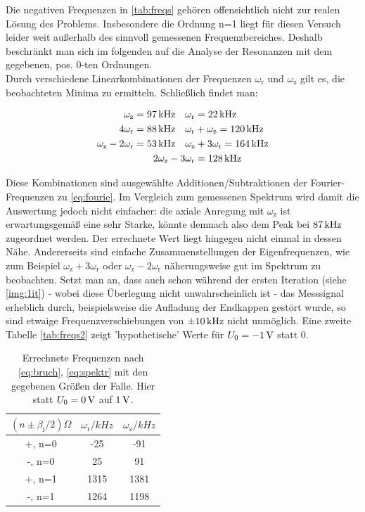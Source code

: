 \documentclass[numbers=noenddot,a4paper,notitlepage,twoside,BCOR15mm]{scrartcl}
\newcommand{\ix}[1]{_\text{#1}}
\begin{document}
			Die negativen Frequenzen in \autoref{tab:freqs} gehören offensichtlich nicht zur realen Lösung des Problems. Insbesondere die Ordnung n=1 liegt für diesen Versuch leider weit außerhalb des sinnvoll gemessenen Frequenzbereiches. Deshalb beschränkt man sich im folgenden auf die Analyse der Resonanzen mit dem gegebenen, pos. 0-ten Ordnungen.\\
			Durch verschiedene Linearkombinationen der Frequenzen $\omega\ix{r}$ und $\omega\ix{z}$ gilt es, die beobachteten Minima zu ermitteln. Schließlich findet man:

				\begin{align}
					\omega\ix{z}=\unit[97]{kHz} \quad& \omega\ix{r}=\unit[22]{kHz} \nonumber \\
					4\omega\ix{r}=\unit[88]{kHz} \quad& \omega\ix{r}+\omega\ix{z}=\unit[120]{kHz} \nonumber \\ \omega\ix{z}-2\omega\ix{r}=\unit[53]{kHz} \quad& \omega\ix{z}+3\omega\ix{r}=\unit[164]{kHz} \nonumber \\
					2\omega\ix{z}-3&\omega\ix{r}=\unit[128]{kHz} \nonumber
				\end{align}

			Diese Kombinationen sind ausgewählte Additionen/Subtraktionen der Fourier-Frequenzen zu \autoref{eq:fourie}. Im Vergleich zum gemessenen Spektrum wird damit die Auswertung jedoch nicht einfacher: die axiale Anregung mit $\omega\ix{z}$ ist erwartungsgemäß eine sehr Starke, könnte demnach also dem Peak bei $\unit[87]{kHz}$ zugeordnet werden. Der errechnete Wert liegt hingegen nicht einmal in dessen Nähe. Andererseits sind einfache Zusammenstellungen der Eigenfrequenzen, wie zum Beispiel $\omega\ix{z}+3\omega\ix{r}$ oder $\omega\ix{z}-2\omega\ix{r}$ näherungsweise gut im Spektrum zu beobachten. Setzt man an, dass auch schon während der ersten Iteration (siehe \autoref{img:1it}) - wobei diese Überlegung nicht unwahrscheinlich ist - das Messsignal erheblich durch, beispielsweise die Aufladung der Endkappen gestört wurde, so sind etwaige Frequenzverschiebungen von $\pm\unit[10]{kHz}$ nicht unmöglich. Eine zweite Tabelle \autoref{tab:freqs2} zeigt 'hypothetische' Werte für $U\ix{0}=\unit[-1]{V}$ statt 0.

				\begin{table}[H]
					\centering
					\begin{tabular}{c|c|c}
						\hline $(n\pm\beta\ix{i}/2)\Omega$ & $\omega\ix{r}/\unit{kHz}$ & $\omega\ix{z}/\unit{kHz}$\\
						\hline\hline +, n=0 & -25 & -91 \\
						\hline  -, n=0 & 25 & 91 \\
						\hline +, n=1 & 1315 & 1381 \\
						\hline -, n=1 & 1264 & 1198
					\end{tabular}
					\caption{Errechnete Frequenzen nach \autoref{eq:bruch}, \autoref{eq:spektr} mit den gegebenen Größen der Falle. Hier statt $U\ix{0}=\unit[0]{V}$ auf $\unit[1]{V}$.}
					\label{tab:freqs2}
				\end{table}
\end{document}
